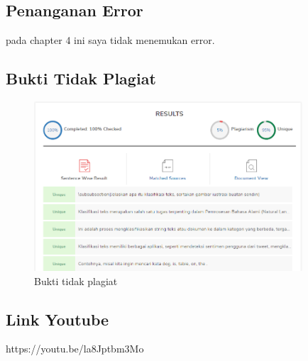 \subsection{Penanganan Error}
pada chapter 4 ini saya tidak menemukan error.

\subsection{Bukti Tidak Plagiat}
\begin{figure}[H]
	\includegraphics[width=10cm]{figures/1174083/figures4/20.png}
	\centering
	\caption{Bukti tidak plagiat}
\end{figure}

\subsection{Link Youtube}
https://youtu.be/la8Jptbm3Mo